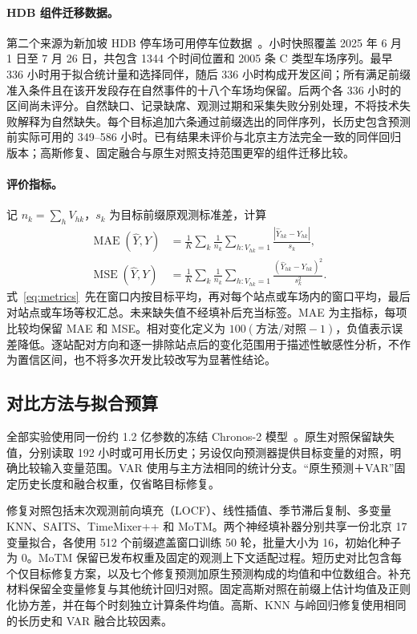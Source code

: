\paragraph{HDB 组件迁移数据。}
第二个来源为新加坡 HDB 停车场可用停车位数据~\citep{hdbavailability}。小时快照覆盖 2025 年 6 月 1 日至 7 月 26 日，共包含 1344 个时间位置和 2005 条 C 类型车场序列。最早 336 小时用于拟合统计量和选择同伴，随后 336 小时构成开发区间；所有满足前缀准入条件且在该开发段存在自然事件的十八个车场均保留。后两个各 336 小时的区间尚未评分。自然缺口、记录缺席、观测过期和采集失败分别处理，不将技术失败解释为自然缺失。每个目标追加六条通过前缀选出的同伴序列，长历史包含预测前实际可用的 349--586 小时。已有结果未评价与北京主方法完全一致的同伴回归版本；高斯修复、固定融合与原生对照支持范围更窄的组件迁移比较。

\paragraph{评价指标。}
记 $n_k=\sum_hV_{hk}$，$s_k$ 为目标前缀原观测标准差，计算
\begin{align}
 \operatorname{MAE}(\widehat Y,Y)&=\frac1K\sum_k\frac1{n_k}
   \sum_{h:V_{hk}=1}\frac{|\widehat Y_{hk}-Y_{hk}|}{s_k},\nonumber\\
 \operatorname{MSE}(\widehat Y,Y)&=\frac1K\sum_k\frac1{n_k}
   \sum_{h:V_{hk}=1}\frac{(\widehat Y_{hk}-Y_{hk})^2}{s_k^2}.
 \label{eq:metrics}
\end{align}
式~\eqref{eq:metrics}~先在窗口内按目标平均，再对每个站点或车场内的窗口平均，最后对站点或车场等权汇总。未来缺失值不经填补后充当标签。MAE 为主指标，每项比较均保留 MAE 和 MSE。相对变化定义为 $100(\text{方法}/\text{对照}-1)$，负值表示误差降低。逐站配对方向和逐一排除站点后的变化范围用于描述性敏感性分析，不作为置信区间，也不将多次开发比较改写为显著性结论。

\subsection{对比方法与拟合预算}

全部实验使用同一份约 1.2 亿参数的冻结 Chronos-2 模型~\citep{ansari2025chronos2}。原生对照保留缺失值，分别读取 192 小时或可用长历史；另设仅向预测器提供目标变量的对照，明确比较输入变量范围。VAR 使用与主方法相同的统计分支。“原生预测＋VAR”固定历史长度和融合权重，仅省略目标修复。

修复对照包括末次观测前向填充（LOCF）、线性插值、季节滞后复制、多变量 KNN、SAITS、TimeMixer++ 和 MoTM。两个神经填补器分别共享一份北京 17 变量拟合，各使用 512 个前缀遮盖窗口训练 50 轮，批量大小为 16，初始化种子为 0。MoTM 保留已发布权重及固定的观测上下文适配过程。短历史对比包含每个仅目标修复方案，以及七个修复预测加原生预测构成的均值和中位数组合。补充材料保留全变量修复与其他统计回归对照。固定高斯对照在前缀上估计均值及正则化协方差，并在每个时刻独立计算条件均值。高斯、KNN 与岭回归修复使用相同的长历史和 VAR 融合比较因素。

